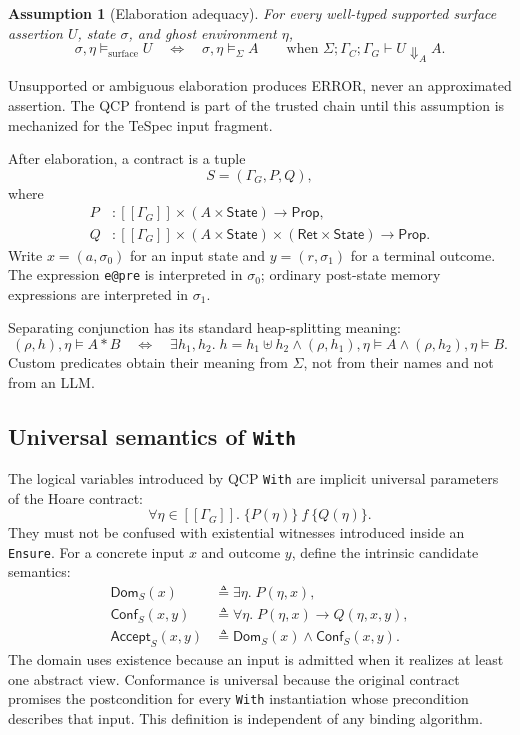 \documentclass[10pt]{article}
\newtheorem{assumption}{Assumption}
\newcommand{\error}{\textsf{ERROR}}
\newcommand{\Prop}{\mathsf{Prop}}
\newcommand{\State}{\mathsf{State}}
\newcommand{\Ret}{\mathsf{Ret}}
\newcommand{\sem}[1]{[\![ #1 ]\!]}
\newcommand{\sat}{\models}
\newcommand{\ctx}{\Sigma}
\newcommand{\ghost}{\eta}
\begin{document}
\begin{assumption}[Elaboration adequacy]
For every well-typed supported surface assertion $U$, state $\sigma$, and
ghost environment $\ghost$,
\[
  \sigma,\ghost \sat_{\mathrm{surface}} U
  \quad\Longleftrightarrow\quad
  \sigma,\ghost \sat_{\ctx} A
  \qquad
  \text{when }\ctx;\Gamma_C;\Gamma_G\vdash U\Downarrow_{\!A}A.
\]
\end{assumption}
Unsupported or ambiguous elaboration produces \error{}, never an
approximated assertion.  The QCP frontend is part of the trusted chain until
this assumption is mechanized for the TeSpec input fragment.

After elaboration, a contract is a tuple
\[
  S=(\Gamma_G,P,Q),
\]
where
\[
\begin{split}
P &: \sem{\Gamma_G}\times(A\times\State) \rightarrow \Prop,\\
Q &: \sem{\Gamma_G}\times(A\times\State)
      \times(\Ret\times\State)\rightarrow \Prop.
\end{split}
\]
Write $x=(a,\sigma_0)$ for an input state and $y=(r,\sigma_1)$ for a terminal
outcome.  The expression \texttt{e@pre} is interpreted in $\sigma_0$;
ordinary post-state memory expressions are interpreted in $\sigma_1$.

Separating conjunction has its standard heap-splitting meaning:
\[
(\rho,h),\ghost\sat A*B
\quad\Longleftrightarrow\quad
\exists h_1,h_2.\;
h=h_1\uplus h_2\land
(\rho,h_1),\ghost\sat A\land
(\rho,h_2),\ghost\sat B.
\]
Custom predicates obtain their meaning from $\ctx$, not from their names and
not from an LLM.

\subsection{Universal semantics of \texttt{With}}
\label{sec:binding}

The logical variables introduced by QCP \texttt{With} are implicit universal
parameters of the Hoare contract:
\[
  \forall\ghost\in\sem{\Gamma_G}.\;\{P(\ghost)\}\ f\ \{Q(\ghost)\}.
\]
They must not be confused with existential witnesses introduced inside an
\texttt{Ensure}.  For a concrete input $x$ and outcome $y$, define the
intrinsic candidate semantics:
\[
\begin{split}
\mathsf{Dom}_S(x)
  &\triangleq \exists\ghost.\;P(\ghost,x),\\
\mathsf{Conf}_S(x,y)
  &\triangleq \forall\ghost.\;P(\ghost,x)\rightarrow Q(\ghost,x,y),\\
\mathsf{Accept}_S(x,y)
  &\triangleq \mathsf{Dom}_S(x)\land\mathsf{Conf}_S(x,y).
\end{split}
\]
The domain uses existence because an input is admitted when it realizes at
least one abstract view.  Conformance is universal because the original
contract promises the postcondition for every \texttt{With} instantiation
whose precondition describes that input.  This definition is independent of
any binding algorithm.
\end{document}
